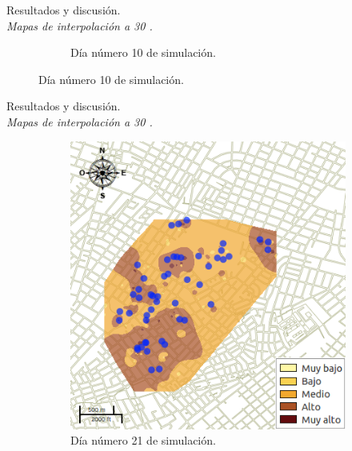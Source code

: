 \begin{frame}[t]{Resultados y discusión.\\\textit{Mapas de interpolación a 30 \textcelsius.}}
\begin{figure}
\begin{subfigure}[b]{0.45\textwidth}
        \caption{Día número 10 de simulación.}
    \end{subfigure}
    \end{figure}
\end{frame}


\begin{frame}[t]{Resultados y discusión.\\\textit{Mapas de interpolación a 30 \textcelsius.}}
    \begin{figure}
    \begin{subfigure}[b]{0.45\textwidth}
        \includegraphics[width=\textwidth]{../book/capitulo-6/graphics/raster/temp-30-20.png}
        \caption{Día número 21 de simulación.}
    \end{subfigure}
    ~~~~
    \begin{subfigure}[b]{0.45\textwidth}

\end{subfigure}
\end{figure}
\end{frame}
